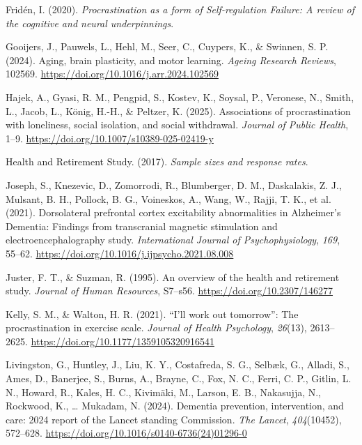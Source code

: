\documentclass[
]{article}
\newlength{\cslhangindent}
\newenvironment{CSLReferences}[2] %
 {\begin{list}{}{%
  \setlength{\itemindent}{0pt}
  \setlength{\leftmargin}{0pt}
  \setlength{\parsep}{0pt}
  \ifodd #1
   \setlength{\leftmargin}{\cslhangindent}
   \setlength{\itemindent}{-1\cslhangindent}
  \fi
  \setlength{\itemsep}{#2\baselineskip}}}
 {\end{list}}
\begin{document}
\begin{CSLReferences}{1}{0}
Fridén, I. (2020). \emph{Procrastination as a form of {Self-regulation
Failure}: {A} review of the cognitive and neural underpinnings}.

Gooijers, J., Pauwels, L., Hehl, M., Seer, C., Cuypers, K., \& Swinnen,
S. P. (2024). Aging, brain plasticity, and motor learning. \emph{Ageing
Research Reviews}, 102569.
\url{https://doi.org/10.1016/j.arr.2024.102569}

Hajek, A., Gyasi, R. M., Pengpid, S., Kostev, K., Soysal, P., Veronese,
N., Smith, L., Jacob, L., König, H.-H., \& Peltzer, K. (2025).
Associations of procrastination with loneliness, social isolation, and
social withdrawal. \emph{Journal of Public Health}, 1--9.
\url{https://doi.org/10.1007/s10389-025-02419-y}

Health and Retirement Study. (2017). \emph{Sample sizes and response
rates}.

Joseph, S., Knezevic, D., Zomorrodi, R., Blumberger, D. M., Daskalakis,
Z. J., Mulsant, B. H., Pollock, B. G., Voineskos, A., Wang, W., Rajji,
T. K., et al. (2021). Dorsolateral prefrontal cortex excitability
abnormalities in {Alzheimer}'s {Dementia}: {Findings} from transcranial
magnetic stimulation and electroencephalography study.
\emph{International Journal of Psychophysiology}, \emph{169}, 55--62.
\url{https://doi.org/10.1016/j.ijpsycho.2021.08.008}

Juster, F. T., \& Suzman, R. (1995). An overview of the health and
retirement study. \emph{Journal of Human Resources}, S7--s56.
\url{https://doi.org/10.2307/146277}

Kelly, S. M., \& Walton, H. R. (2021). {``{I}'ll work out tomorrow''}:
The procrastination in exercise scale. \emph{Journal of Health
Psychology}, \emph{26}(13), 2613--2625.
\url{https://doi.org/10.1177/1359105320916541}

Livingston, G., Huntley, J., Liu, K. Y., Costafreda, S. G., Selbæk, G.,
Alladi, S., Ames, D., Banerjee, S., Burns, A., Brayne, C., Fox, N. C.,
Ferri, C. P., Gitlin, L. N., Howard, R., Kales, H. C., Kivimäki, M.,
Larson, E. B., Nakasujja, N., Rockwood, K., \ldots{} Mukadam, N. (2024).
Dementia prevention, intervention, and care: 2024 report of the {Lancet}
standing {Commission}. \emph{The Lancet}, \emph{404}(10452), 572--628.
\url{https://doi.org/10.1016/s0140-6736(24)01296-0}


\end{CSLReferences}
\end{document}
